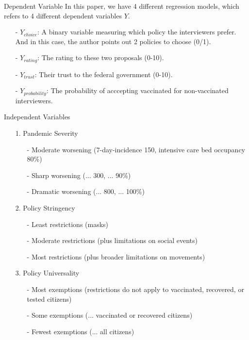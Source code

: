 \documentclass{beamer}
\begin{document}
\begin{frame}{Dependent Variable}
	\noindent In this paper, we have 4 different regression models, which refers to 4 different dependent variables $Y$.
	\par
	\begin{itemize}
		\item[-] $Y_{choice}$: A binary variable measuring which policy the interviewers prefer. And in this case, the author points out 2 policies to choose (0/1).
		\item[-] $Y_{rating}$: The rating to these two proposals (0-10).
		\item[-] $Y_{trust}$: Their trust to the federal government (0-10).
		\item[-] $Y_{probability}$: The probability of acccepting vaccinated for non-vaccinated interviewers. 
	\end{itemize}
\end{frame}

\begin{frame}{Independent Variables}
\begin{itemize}
	\item[1.] Pandemic Severity
	\begin{enumerate}
		\item[-] Moderate worsening (7-day-incidence 150, intensive care bed occupancy 80\%)
		\item[-] Sharp worsening (... 300, ... 90\%)
		\item[-] Dramatic worsening (... 800, ... 100\%)
	\end{enumerate}
	\item[2.] Policy Stringency
	\begin{enumerate}
		\item[-]  Least restrictions (masks)
		\item[-]  Moderate restrictions (plus limitations on social events)
		\item[-]  Most restrictions (plus broader limitations on movements)
	\end{enumerate}
	\item[3.] Policy Universality
	\begin{enumerate}
		\item[-] Most exemptions (restrictions do not apply to vaccinated, recovered, or tested citizens)
		\item[-] Some exemptions (... vaccinated or recovered citizens)
		\item[-] Fewest exemptions (... all citizens)
	\end{enumerate}
\end{itemize}
\end{frame}
\end{document}
